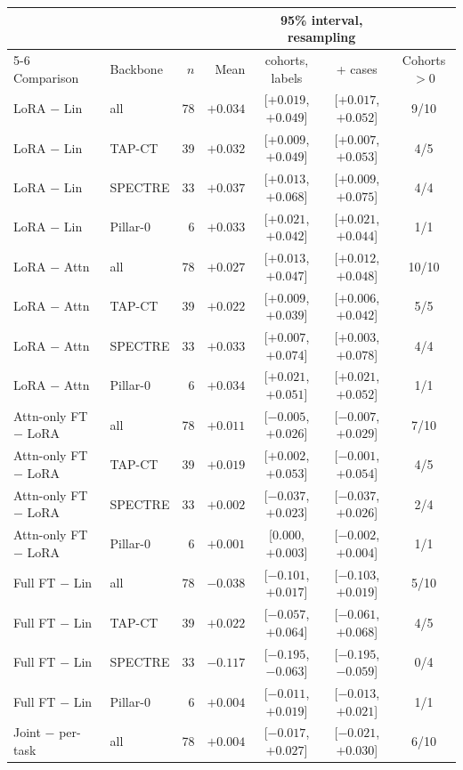 \begin{tabular}{llrrccc}
\toprule
 & & & & \multicolumn{2}{c}{95\% interval, resampling} & \\
\cmidrule(lr){5-6}
Comparison & Backbone & $n$ & Mean & cohorts, labels & + cases & Cohorts $>0$ \\
\midrule
LoRA $-$ Lin & all & 78 & $+0.034$ & [$+0.019$, $+0.049$] & [$+0.017$, $+0.052$] & 9/10 \\
LoRA $-$ Lin & TAP-CT & 39 & $+0.032$ & [$+0.009$, $+0.049$] & [$+0.007$, $+0.053$] & 4/5 \\
LoRA $-$ Lin & SPECTRE & 33 & $+0.037$ & [$+0.013$, $+0.068$] & [$+0.009$, $+0.075$] & 4/4 \\
LoRA $-$ Lin & Pillar-0 & 6 & $+0.033$ & [$+0.021$, $+0.042$] & [$+0.021$, $+0.044$] & 1/1 \\
\addlinespace[2pt]
LoRA $-$ Attn & all & 78 & $+0.027$ & [$+0.013$, $+0.047$] & [$+0.012$, $+0.048$] & 10/10 \\
LoRA $-$ Attn & TAP-CT & 39 & $+0.022$ & [$+0.009$, $+0.039$] & [$+0.006$, $+0.042$] & 5/5 \\
LoRA $-$ Attn & SPECTRE & 33 & $+0.033$ & [$+0.007$, $+0.074$] & [$+0.003$, $+0.078$] & 4/4 \\
LoRA $-$ Attn & Pillar-0 & 6 & $+0.034$ & [$+0.021$, $+0.051$] & [$+0.021$, $+0.052$] & 1/1 \\
\addlinespace[2pt]
Attn-only FT $-$ LoRA & all & 78 & $+0.011$ & [$-0.005$, $+0.026$] & [$-0.007$, $+0.029$] & 7/10 \\
Attn-only FT $-$ LoRA & TAP-CT & 39 & $+0.019$ & [$+0.002$, $+0.053$] & [$-0.001$, $+0.054$] & 4/5 \\
Attn-only FT $-$ LoRA & SPECTRE & 33 & $+0.002$ & [$-0.037$, $+0.023$] & [$-0.037$, $+0.026$] & 2/4 \\
Attn-only FT $-$ LoRA & Pillar-0 & 6 & $+0.001$ & [$0.000$, $+0.003$] & [$-0.002$, $+0.004$] & 1/1 \\
\addlinespace[2pt]
Full FT $-$ Lin & all & 78 & $-0.038$ & [$-0.101$, $+0.017$] & [$-0.103$, $+0.019$] & 5/10 \\
Full FT $-$ Lin & TAP-CT & 39 & $+0.022$ & [$-0.057$, $+0.064$] & [$-0.061$, $+0.068$] & 4/5 \\
Full FT $-$ Lin & SPECTRE & 33 & $-0.117$ & [$-0.195$, $-0.063$] & [$-0.195$, $-0.059$] & 0/4 \\
Full FT $-$ Lin & Pillar-0 & 6 & $+0.004$ & [$-0.011$, $+0.019$] & [$-0.013$, $+0.021$] & 1/1 \\
\addlinespace[2pt]
Joint $-$ per-task & all & 78 & $+0.004$ & [$-0.017$, $+0.027$] & [$-0.021$, $+0.030$] & 6/10 \\

\end{tabular}
